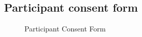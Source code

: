 \documentclass{l4proj}
\begin{document}
\begin{appendices}
\section{Participant consent form}
\begin{figure}[H]
\centering
{}
\caption{Participant Consent Form}
\label{appendix:pcf}
\end{figure}

\end{appendices}
\end{document}
